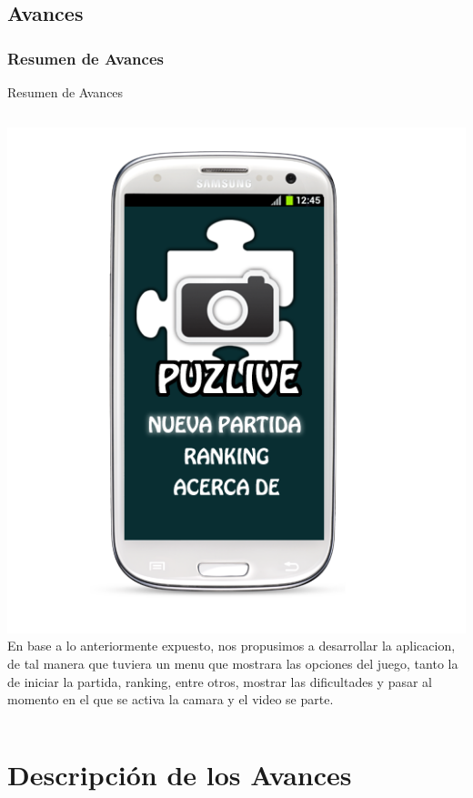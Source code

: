 \documentclass[serif,11pt]{beamer}
\begin{document}
		\subsection{Avances}

			\begin{frame}\frametitle{Resumen de Avances}
				\pause \bigskip
				\begin{block}{Resumen de Avances}
					\begin{columns}
						 \hspace{0.5cm}
						\includegraphics[width=1\textwidth]{androidpro4} 
						En base a lo anteriormente expuesto, nos propusimos a desarrollar la aplicacion, de
						tal manera que tuviera un menu que mostrara las opciones del juego, tanto la de
						iniciar la partida, ranking, entre otros, mostrar las dificultades y pasar al momento 
						en el que se activa la camara y el video se parte.	
					\end{columns}
				\end{block}
			\end{frame}



	\section{Descripci\'on de los Avances} 
\end{document}
